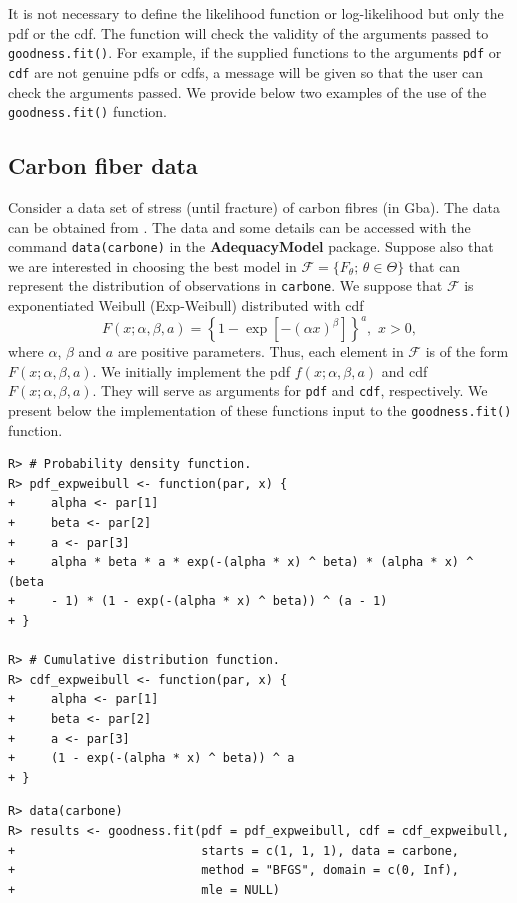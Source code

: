 \documentclass[10pt,letterpaper]{article}
\begin{document}
It is not necessary to define the likelihood function or log-likelihood but only the pdf or the cdf.
The function will check the validity of the arguments passed to \texttt{goodness.fit()}.
For example, if the supplied
functions to the arguments \texttt{pdf} or \texttt{cdf} are not genuine pdfs or cdfs, a message will be given so that the user
can check the arguments passed.
We provide below two examples of the use of the \texttt{goodness.fit()} function.

\subsection{Carbon fiber data}

Consider a data set of stress (until fracture) of carbon fibres (in Gba).
The data can be obtained from \cite{nicholspadgett2006}.
The data and some details can be accessed with the command \texttt{data(carbone)} in the \textbf{AdequacyModel} package.
Suppose also that we are interested
in choosing the best model in $\mathcal{F}=\{F_\theta;\, \theta \in \Theta \}$ that can represent the distribution of  observations  in \texttt{carbone}.
We suppose that $\mathcal{F}$ is exponentiated Weibull (Exp-Weibull) distributed with cdf
$$F(x;\alpha, \beta, a) = \left\{1 - \exp\left[-(\alpha x)^\beta\right]\right\}^a,\,\,x>0,$$
where $\alpha$, $\beta$ and $a$ are positive parameters.
Thus, each element in $\mathcal{F}$ is of the form $F(x;\alpha,\beta,a)$.
We initially implement the pdf $f(x; \alpha, \beta, a)$ and cdf $F(x; \alpha, \beta, a)$.
They will serve as arguments for \texttt{pdf} and \texttt{cdf}, respectively.
We present below the implementation of these functions input to the \texttt{goodness.fit()} function.

\begin{verbatim}
R> # Probability density function.
R> pdf_expweibull <- function(par, x) {
+     alpha <- par[1]
+     beta <- par[2]
+     a <- par[3]
+     alpha * beta * a * exp(-(alpha * x) ^ beta) * (alpha * x) ^ (beta
+     - 1) * (1 - exp(-(alpha * x) ^ beta)) ^ (a - 1)
+ }

R> # Cumulative distribution function.
R> cdf_expweibull <- function(par, x) {
+     alpha <- par[1]
+     beta <- par[2]
+     a <- par[3]
+     (1 - exp(-(alpha * x) ^ beta)) ^ a
+ }
\end{verbatim}
\begin{verbatim}
R> data(carbone)
R> results <- goodness.fit(pdf = pdf_expweibull, cdf = cdf_expweibull,
+                          starts = c(1, 1, 1), data = carbone,
+                          method = "BFGS", domain = c(0, Inf),
+                          mle = NULL)
\end{verbatim}
\end{document}
